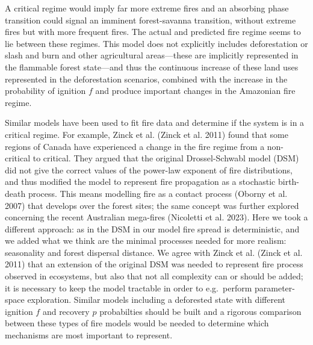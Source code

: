 \documentclass[
]{article}
\begin{document}
A critical regime would imply far more extreme fires and an absorbing
phase transition could signal an imminent forest-savanna transition,
without extreme fires but with more frequent fires. The actual and
predicted fire regime seems to lie between these regimes. This model
does not explicitly includes deforestation or slash and burn and other
agricultural areas---these are implicitly represented in the flammable
forest state---and thus the continuous increase of these land uses
represented in the deforestation scenarios, combined with the increase
in the probability of ignition \(f\) and produce important changes in
the Amazonian fire regime.

Similar models have been used to fit fire data and determine if the
system is in a critical regime. For example, Zinck et al. (Zinck et al.
2011) found that some regions of Canada have experienced a change in the
fire regime from a non-critical to critical. They argued that the
original Drossel-Schwabl model (DSM) did not give the correct values of
the power-law exponent of fire distributions, and thus modified the
model to represent fire propagation as a stochastic birth-death process.
This means modelling fire as a contact process (Oborny et al. 2007) that
develops over the forest sites; the same concept was further explored
concerning the recent Australian mega-fires (Nicoletti et al. 2023).
Here we took a different approach: as in the DSM in our model fire
spread is deterministic, and we added what we think are the minimal
processes needed for more realism: seasonality and forest dispersal
distance. We agree with Zinck et al. (Zinck et al. 2011) that an
extension of the original DSM was needed to represent fire process
observed in ecosystems, but also that not all complexity can or should
be added; it is necessary to keep the model tractable in order to
e.g.~perform parameter-space exploration. Similar models including a
deforested state with different ignition \(f\) and recovery \(p\)
probabilties should be built and a rigorous comparison between these
types of fire models would be needed to determine which mechanisms are
most important to represent.
\end{document}
